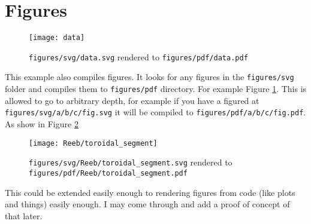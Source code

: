 \section{Figures}

\begin{figure}[h]
  \centering
  \texttt{[image: data]}
  \caption{\texttt{figures/svg/data.svg} rendered to \texttt{figures/pdf/data.pdf}}
\label{fig:data}
\end{figure}
This example also compiles figures. It looks for any figures in the \texttt{figures/svg} folder and compiles them to \texttt{figures/pdf} directory. For example Figure \ref{fig:data}. This is allowed to go to arbitrary depth, for example if you have a figured at \texttt{figures/svg/a/b/c/fig.svg} it will be compiled to \texttt{figures/pdf/a/b/c/fig.pdf}. As show in Figure \ref{fig:reeb}
\begin{figure}
  \centering
  \texttt{[image: Reeb/toroidal\_segment]}
  \caption{\texttt{figures/svg/Reeb/toroidal\_segment.svg} rendered to \texttt{figures/pdf/Reeb/toroidal\_segment.pdf}}
\label{fig:reeb}
\end{figure}
This could be extended easily enough to rendering figures from code (like plots and things) easily enough. I may come through and add a proof of concept of that later. 
